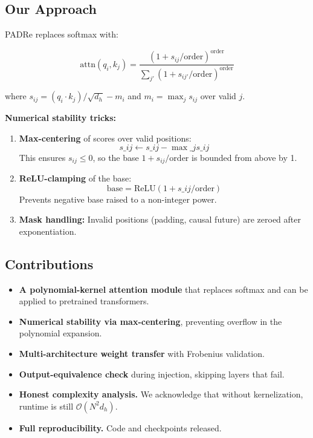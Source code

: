 \subsection{Our Approach}

PADRe replaces softmax with:

\[
\text{attn}(q_i, k_j) = \frac{(1 + s_{ij}/\text{order})^\text{order}}{\sum_{j'} (1 + s_{ij'}/\text{order})^\text{order}}
\tag{1.4}
\]

where $s_{ij} = (q_i \cdot k_j)/\sqrt{d_h} - m_i$ and $m_i = \max_j s_{ij}$ over valid $j$.

\textbf{Numerical stability tricks:}

\begin{enumerate}
\item \textbf{Max-centering} of scores over valid positions:
  $$
  s\_{ij} \leftarrow s\_{ij} - \max\_j s\_{ij}
  \tag{1.5}
  $$
  This ensures $s_{ij} \leq 0$, so the base $1 + s_{ij}/\text{order}$ is
  bounded from above by 1.

\item \textbf{ReLU-clamping} of the base:
  $$
  \text{base} = \text{ReLU}(1 + s\_{ij}/\text{order})
  \tag{1.6}
  $$
  Prevents negative base raised to a non-integer power.

\item \textbf{Mask handling:} Invalid positions (padding, causal future) are zeroed
  after exponentiation.

\end{enumerate}
\subsection{Contributions}

\begin{itemize}
\item \textbf{A polynomial-kernel attention module} that replaces softmax and can be
  applied to pretrained transformers.
\item \textbf{Numerical stability via max-centering}, preventing overflow in the
  polynomial expansion.
\item \textbf{Multi-architecture weight transfer} with Frobenius validation.
\item \textbf{Output-equivalence check} during injection, skipping layers that fail.
\item \textbf{Honest complexity analysis.} We acknowledge that without kernelization,
  runtime is still $\mathcal{O}(N^2 d_h)$.
\item \textbf{Full reproducibility.} Code and checkpoints released.

\end{itemize}
